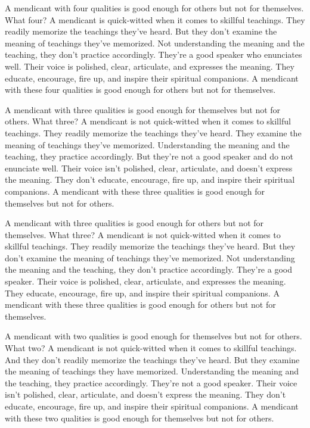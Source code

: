 \documentclass[12pt,openany]{book}%
\begin{document}
A mendicant with four qualities is good enough for others but not for themselves. What four? A mendicant is quick-witted when it comes to skillful teachings. They readily memorize the teachings they’ve heard. But they don’t examine the meaning of teachings they’ve memorized. Not understanding the meaning and the teaching, they don’t practice accordingly. They’re a good speaker who enunciates well. Their voice is polished, clear, articulate, and expresses the meaning. They educate, encourage, fire up, and inspire their spiritual companions. A mendicant with these four qualities is good enough for others but not for themselves. 

A mendicant with three qualities is good enough for themselves but not for others. What three? A mendicant is not quick-witted when it comes to skillful teachings. They readily memorize the teachings they’ve heard. They examine the meaning of teachings they’ve memorized. Understanding the meaning and the teaching, they practice accordingly. But they’re not a good speaker and do not enunciate well. Their voice isn’t polished, clear, articulate, and doesn’t express the meaning. They don’t educate, encourage, fire up, and inspire their spiritual companions. A mendicant with these three qualities is good enough for themselves but not for others. 

A mendicant with three qualities is good enough for others but not for themselves. What three? A mendicant is not quick-witted when it comes to skillful teachings. They readily memorize the teachings they’ve heard. But they don’t examine the meaning of teachings they’ve memorized. Not understanding the meaning and the teaching, they don’t practice accordingly. They’re a good speaker. Their voice is polished, clear, articulate, and expresses the meaning. They educate, encourage, fire up, and inspire their spiritual companions. A mendicant with these three qualities is good enough for others but not for themselves. 

A mendicant with two qualities is good enough for themselves but not for others. What two? A mendicant is not quick-witted when it comes to skillful teachings. And they don’t readily memorize the teachings they’ve heard. But they examine the meaning of teachings they have memorized. Understanding the meaning and the teaching, they practice accordingly. They’re not a good speaker. Their voice isn’t polished, clear, articulate, and doesn’t express the meaning. They don’t educate, encourage, fire up, and inspire their spiritual companions. A mendicant with these two qualities is good enough for themselves but not for others. 
\end{document}
